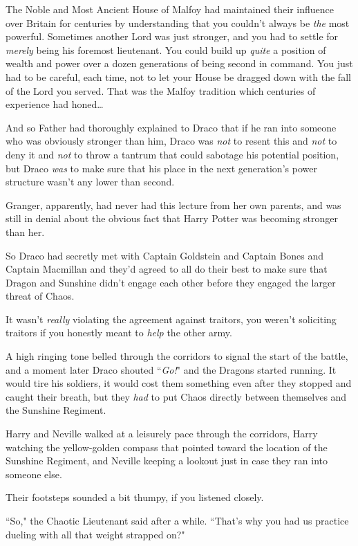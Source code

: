 The Noble and Most Ancient House of Malfoy had maintained their influence over Britain for centuries by understanding that you couldn't always be \emph{the} most powerful. Sometimes another Lord was just stronger, and you had to settle for \emph{merely} being his foremost lieutenant. You could build up \emph{quite} a position of wealth and power over a dozen generations of being second in command. You just had to be careful, each time, not to let your House be dragged down with the fall of the Lord you served. That was the Malfoy tradition which centuries of experience had honed{\ldots}

And so Father had thoroughly explained to Draco that if he ran into someone who was obviously stronger than him, Draco was \emph{not} to resent this and \emph{not} to deny it and \emph{not} to throw a tantrum that could sabotage his potential position, but Draco \emph{was} to make sure that his place in the next generation's power structure wasn't any lower than second.

Granger, apparently, had never had this lecture from her own parents, and was still in denial about the obvious fact that Harry Potter was becoming stronger than her.

So Draco had secretly met with Captain Goldstein and Captain Bones and Captain Macmillan and they'd agreed to all do their best to make sure that Dragon and Sunshine didn't engage each other before they engaged the larger threat of Chaos.

It wasn't \emph{really} violating the agreement against traitors, you weren't soliciting traitors if you honestly meant to \emph{help} the other army.

A high ringing tone belled through the corridors to signal the start of the battle, and a moment later Draco shouted ``\emph{Go!}" and the Dragons started running. It would tire his soldiers, it would cost them something even after they stopped and caught their breath, but they \emph{had} to put Chaos directly between themselves and the Sunshine Regiment.

\later

Harry and Neville walked at a leisurely pace through the corridors, Harry watching the yellow-golden compass that pointed toward the location of the Sunshine Regiment, and Neville keeping a lookout just in case they ran into someone else.

Their footsteps sounded a bit thumpy, if you listened closely.

``So," the Chaotic Lieutenant said after a while. ``That's why you had us practice dueling with all that weight strapped on?"

